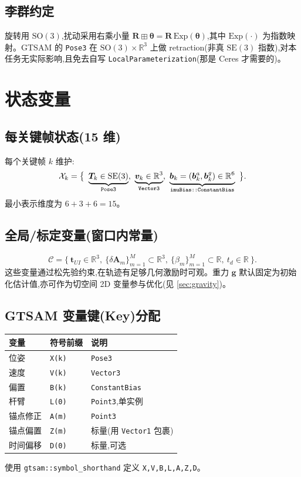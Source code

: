 \documentclass[11pt,a4paper]{report}
\newcommand{\R}{\mathbb{R}}
\newcommand{\SO}{\mathrm{SO}(3)}
\newcommand{\SE}{\mathrm{SE}(3)}
\newcommand{\bv}{\bm{v}}
\newcommand{\bb}{\bm{b}}
\newcommand{\bg}{\bm{g}}
\newcommand{\bR}{\bm{R}}
\newcommand{\bT}{\bm{T}}
\newcommand{\bA}{\bm{A}}
\newcommand{\bt}{\bm{t}}
\begin{document}
\section{李群约定}
旋转用 $\SO$,扰动采用右乘小量 $\bR\boxplus\bm{\theta}=\bR\,\mathrm{Exp}(\bm{\theta})$,其中 $\mathrm{Exp}(\cdot)$ 为指数映射。GTSAM 的 \texttt{Pose3} 在 $\SO\times\R^3$ 上做 retraction(非真 $\SE$ 指数),对本任务无实际影响,且免去自写 \texttt{LocalParameterization}(那是 Ceres 才需要的)。

\chapter{状态变量}

\section{每关键帧状态(15 维)}
每个关键帧 $k$ 维护:
\begin{equation}
\mathcal{X}_k = \big\{\ \underbrace{\bT_k\in\SE}_{\text{\texttt{Pose3}}},\ \underbrace{\bv_k\in\R^3}_{\text{\texttt{Vector3}}},\ \underbrace{\bb_k=(\bb_k^a,\bb_k^g)\in\R^6}_{\text{\texttt{imuBias::ConstantBias}}}\ \big\}.
\end{equation}
最小表示维度为 $6+3+6=15$。

\section{全局/标定变量(窗口内常量)}
\begin{equation}
\mathcal{C} = \big\{\ \bt_{UI}\in\R^3,\ \{\delta\bA_m\}_{m=1}^{M}\subset\R^3,\ \{\beta_m\}_{m=1}^{M}\subset\R,\ t_d\in\R\ \big\}.
\end{equation}
这些变量通过松先验约束,在轨迹有足够几何激励时可观。重力 $\bg$ 默认固定为初始化估计值,亦可作为切空间 2D 变量参与优化(见 \ref{sec:gravity})。

\section{GTSAM 变量键(Key)分配}
\begin{longtable}{l l l}
\toprule
变量 & 符号前缀 & 说明 \\
\midrule
位姿 & \texttt{X(k)} & \texttt{Pose3} \\
速度 & \texttt{V(k)} & \texttt{Vector3} \\
偏置 & \texttt{B(k)} & \texttt{ConstantBias} \\
杆臂 & \texttt{L(0)} & \texttt{Point3},单实例 \\
锚点修正 & \texttt{A(m)} & \texttt{Point3} \\
锚点偏置 & \texttt{Z(m)} & 标量(用 \texttt{Vector1} 包裹) \\
时间偏移 & \texttt{D(0)} & 标量,可选 \\
\bottomrule
\end{longtable}
使用 \texttt{gtsam::symbol\_shorthand} 定义 \texttt{X,V,B,L,A,Z,D}。
\end{document}
